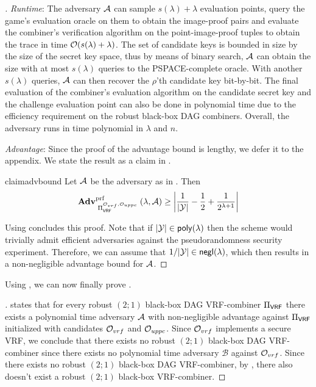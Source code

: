 \begin{proof}[]
	\textit{Runtime}: The adversary $\mathcal{A}$ can sample $s(\lambda) + \lambda$ evaluation points,
	query the game's evaluation oracle on them to obtain the image-proof pairs and
	evaluate the combiner's verification algorithm on the point-image-proof tuples to obtain the trace in time $\mathcal{O}(s(\lambda) + \lambda)$.
	The set of candidate keys is bounded in size by the size of the secret key space, thus by means of binary search, $\mathcal{A}$
	can obtain the size with at most $s(\lambda)$ queries to the PSPACE-complete oracle.
	With another $s(\lambda)$ queries, $\mathcal{A}$ can then recover the $\rho$'th candidate key
	bit-by-bit. The final evaluation of the combiner's evaluation algorithm on the candidate secret key and the challenge evaluation point
	can also be done in polynomial time due to the efficiency requirement on the robust black-box DAG combiners.
	Overall, the adversary runs in time polynomial in $\lambda$ and $n$.

	\textit{Advantage}: Since the proof of the advantage bound is lengthy, we defer it 
	to the appendix. We state the result as a claim in .

	\begin{restatable}{claim}{advbound}\label{claim:adv_bound}
		Let $\mathcal{A}$ be the adversary as in . Then
		\[
			\Adv{\BBComb{VRF}[\O_{vrf}, \O_{uppc}]}{prf}{\lambda, \mathcal A} \ge \abs*{\frac{1}{|\Y|} - \frac{1}{2} + \frac{1}{2^{\lambda + 1}}}
		\]
	\end{restatable}

	Using  concludes this proof.
	Note that if $|\Y| \in \poly$ then the scheme would trivially admit efficient adversaries against the pseudorandomness security experiment.
	Therefore, we can assume that $1/|\Y| \in \negl$, which then results in a non-negligible advantage bound for $\mathcal{A}$.
\end{proof}

Using , we can now finally prove .

\begin{proof}[]
	 states that for every robust $(2;1)$ black-box DAG VRF-combiner $\BBComb{VRF}$ 
	there exists a polynomial time adversary $\mathcal{A}$ with non-negligible advantage against $\BBComb{VRF}$ initialized with 
	candidates $\mathcal{O}_{vrf}$ and $\mathcal{O}_{uppc}$. Since $\mathcal{O}_{vrf}$ implements a secure VRF, we conclude that there exists no
	robust $(2;1)$ black-box DAG VRF-combiner since there exists no polynomial time adversary $\mathcal B$ against $\mathcal{O}_{vrf}$.
	Since there exists no robust $(2;1)$ black-box DAG VRF-combiner, by , there also 
	doesn't exist a robust $(2;1)$ black-box VRF-combiner.
\end{proof}

